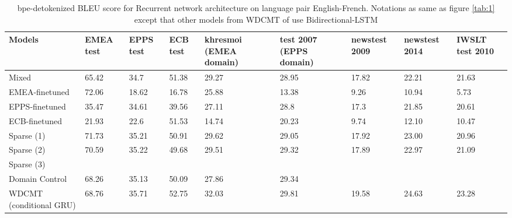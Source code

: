 \documentclass[11pt,a4paper]{article}
\begin{document}
\begin{table}
\begin{center}
 \begin{tabularx}{\textwidth}{|| X | X | X | X | X | X | X | X | X ||} 
 \hline
 Models & EMEA test & EPPS test & ECB test & khresmoi (EMEA domain) & test 2007 (EPPS domain) & newstest 2009 & newstest 2014 & IWSLT test 2010 \\ [0.5ex] 
 \hline\hline
 Mixed & 65.42 & 34.7 & 51.38 & 29.27 & 28.95 & 17.82 & 22.21 & 21.63 \\
 \hline
 EMEA-finetuned  & 72.06 & 18.62 & 16.78 & 25.88 & 13.38 & 9.26 & 10.94 & 5.73 \\
 \hline
 EPPS-finetuned & 35.47 & 34.61 & 39.56 & 27.11 & 28.8 & 17.3 & 21.85 & 20.61 \\
 \hline
 ECB-finetuned & 21.93 & 22.6 & 51.53 & 14.74 & 20.23 & 9.74 & 12.10 & 10.47 \\
 \hline
 Sparse (1) & 71.73 & 35.21 & 50.91 & 29.62 & 29.05 & 17.92 & 23.00 & 20.96 \\
 \hline
 Sparse (2) & 70.59 & 35.22 & 49.68 & 29.51 & 29.32 & 17.89 & 22.97 & 21.09 \\
 \hline
 Sparse (3) &  &  &  &  &  &  &  & \\
 \hline
 Domain Control & 68.26 & 35.13 & 50.09 & 27.86 & 29.34 & & & \\
 \hline
 WDCMT (conditional GRU) & 68.76 & 35.71 & 52.75 & 32.03 & 29.81 & 19.58 & 24.63 & 23.28 \\
 \hline 
\end{tabularx}
\end{center}
\caption{bpe-detokenized BLEU score for Recurrent network architecture on language pair English-French. Notations as same as figure \ref{tab:1} except that other models from WDCMT of \cite{Zeng18multidomain} use Bidirectional-LSTM}
\label{tab:3}
\end{table}
\end{document}
